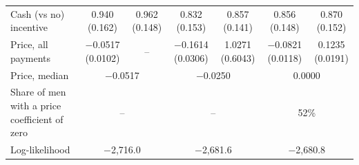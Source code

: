 \begin{tabular}{lcccccc}
Cash (vs no) incentive & \makecell{0.940 \\ {\footnotesize (0.162)}} & \makecell{0.962 \\ {\footnotesize (0.148)}} & \makecell{0.832 \\ {\footnotesize (0.153)}} & \makecell{0.857 \\ {\footnotesize (0.141)}} & \makecell{0.856 \\ {\footnotesize (0.148)}} & \makecell{0.870 \\ {\footnotesize (0.152)}} \\
Price, all payments & \makecell{$-$0.0517 \\ {\footnotesize (0.0102)}} & -- & \makecell{$-$0.1614 \\ {\footnotesize (0.0306)}} & \makecell{1.0271 \\ {\footnotesize (0.6043)}} & \makecell{$-$0.0821 \\ {\footnotesize (0.0118)}} & \makecell{0.1235 \\ {\footnotesize (0.0191)}} \\
\midrule
Price, median & \multicolumn{2}{c}{$-$0.0517} & \multicolumn{2}{c}{$-$0.0250} & \multicolumn{2}{c}{0.0000} \\
Share of men with a price coefficient of zero & \multicolumn{2}{c}{--} & \multicolumn{2}{c}{--} & \multicolumn{2}{c}{52\%} \\
Log-likelihood & \multicolumn{2}{c}{$-$2,716.0} & \multicolumn{2}{c}{$-$2,681.6} & \multicolumn{2}{c}{$-$2,680.8} \\
\bottomrule
\end{tabular}
